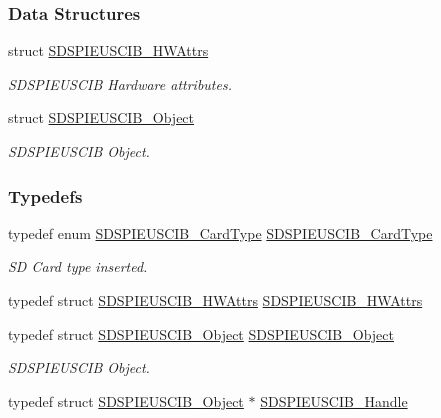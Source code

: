 \subsubsection*{Data Structures}
\begin{DoxyCompactItemize}
\item 
struct \hyperlink{struct_s_d_s_p_i_e_u_s_c_i_b___h_w_attrs}{S\+D\+S\+P\+I\+E\+U\+S\+C\+I\+B\+\_\+\+H\+W\+Attrs}
\begin{DoxyCompactList}\small\item\em S\+D\+S\+P\+I\+E\+U\+S\+C\+I\+B Hardware attributes. \end{DoxyCompactList}\item 
struct \hyperlink{struct_s_d_s_p_i_e_u_s_c_i_b___object}{S\+D\+S\+P\+I\+E\+U\+S\+C\+I\+B\+\_\+\+Object}
\begin{DoxyCompactList}\small\item\em S\+D\+S\+P\+I\+E\+U\+S\+C\+I\+B Object. \end{DoxyCompactList}\end{DoxyCompactItemize}
\subsubsection*{Typedefs}
\begin{DoxyCompactItemize}
\item 
typedef enum \hyperlink{_s_d_s_p_i_e_u_s_c_i_b_8h_a4fa2b3bc20d44e2e53e621d22a3d77a3}{S\+D\+S\+P\+I\+E\+U\+S\+C\+I\+B\+\_\+\+Card\+Type} \hyperlink{_s_d_s_p_i_e_u_s_c_i_b_8h_afa0443874109de3105ef57c073c64b87}{S\+D\+S\+P\+I\+E\+U\+S\+C\+I\+B\+\_\+\+Card\+Type}
\begin{DoxyCompactList}\small\item\em S\+D Card type inserted. \end{DoxyCompactList}\item 
typedef struct \hyperlink{struct_s_d_s_p_i_e_u_s_c_i_b___h_w_attrs}{S\+D\+S\+P\+I\+E\+U\+S\+C\+I\+B\+\_\+\+H\+W\+Attrs} \hyperlink{_s_d_s_p_i_e_u_s_c_i_b_8h_aea56375febef1b4ef0811bedfa893353}{S\+D\+S\+P\+I\+E\+U\+S\+C\+I\+B\+\_\+\+H\+W\+Attrs}
\item 
typedef struct \hyperlink{struct_s_d_s_p_i_e_u_s_c_i_b___object}{S\+D\+S\+P\+I\+E\+U\+S\+C\+I\+B\+\_\+\+Object} \hyperlink{_s_d_s_p_i_e_u_s_c_i_b_8h_a30154e86f98fbe35ef728bbc1d256029}{S\+D\+S\+P\+I\+E\+U\+S\+C\+I\+B\+\_\+\+Object}
\begin{DoxyCompactList}\small\item\em S\+D\+S\+P\+I\+E\+U\+S\+C\+I\+B Object. \end{DoxyCompactList}\item 
typedef struct \hyperlink{struct_s_d_s_p_i_e_u_s_c_i_b___object}{S\+D\+S\+P\+I\+E\+U\+S\+C\+I\+B\+\_\+\+Object} $\ast$ \hyperlink{_s_d_s_p_i_e_u_s_c_i_b_8h_a8561b77d1d064496fd178fcf32053ea3}{S\+D\+S\+P\+I\+E\+U\+S\+C\+I\+B\+\_\+\+Handle}
\end{DoxyCompactItemize}
